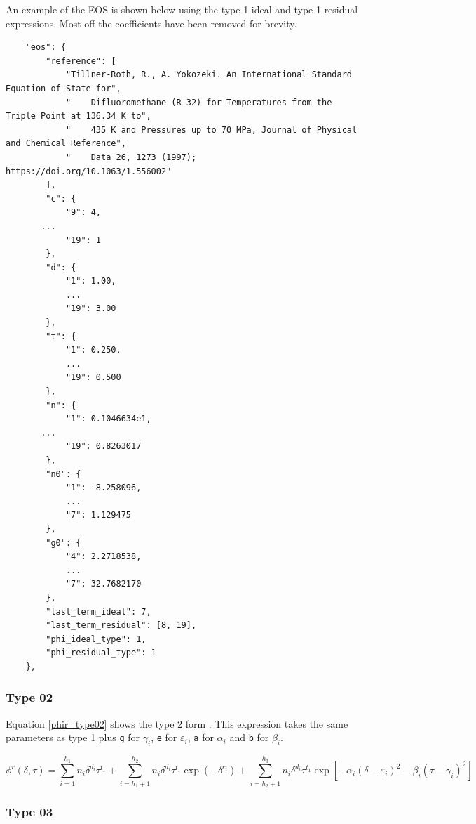 \documentclass[oneside]{book}
\begin{document}
An example of the EOS is shown below using the type 1 ideal and type 1 residual expressions.  Most off the coefficients have been removed for brevity.   

\begin{verbatim}
    "eos": {
        "reference": [
            "Tillner-Roth, R., A. Yokozeki. An International Standard Equation of State for",
            "    Difluoromethane (R-32) for Temperatures from the Triple Point at 136.34 K to",
            "    435 K and Pressures up to 70 MPa, Journal of Physical and Chemical Reference",
            "    Data 26, 1273 (1997); https://doi.org/10.1063/1.556002"
        ],
        "c": {
            "9": 4,
	   ...
            "19": 1
        },
        "d": {
            "1": 1.00,
            ...
            "19": 3.00
        },
        "t": {
            "1": 0.250,
            ... 
            "19": 0.500
        },
        "n": {
            "1": 0.1046634e1,
	   ...
            "19": 0.8263017
        },
        "n0": {
            "1": -8.258096,
            ...
            "7": 1.129475
        },
        "g0": {
            "4": 2.2718538,
            ...
            "7": 32.7682170
        },
        "last_term_ideal": 7,
        "last_term_residual": [8, 19],
        "phi_ideal_type": 1,
        "phi_residual_type": 1
    },
\end{verbatim}

\subsubsection{Type 02}

Equation \ref{phir_type02} shows the type 2 form \cite{osti_402357}.  This expression takes the same parameters as type 1 plus \texttt{g} for $\gamma_i$, \texttt{e} for $\varepsilon_i$, \texttt{a} for $\alpha_i$ and \texttt{b} for $\beta_i$.

\begin{equation}\label{phir_type02}
	\phi^r(\delta, \tau) = \sum^{h_1}_{i=1} n_i \delta^{d_i} \tau^{t_1} + 
	\sum_{i =h_1 + 1}^{h_2} n_i \delta^{d_i} \tau^{t_1} \exp(-\delta^{c_i}) + 
	\sum_{i = h_2 + 1}^{h_3} n_i \delta^{d_i} \tau^{t_1} \exp\left[-\alpha_i(\delta - \varepsilon_i)^2 - \beta_i(\tau - \gamma_i)^2 \right]
\end{equation}

\subsubsection{Type 03}
\end{document}
